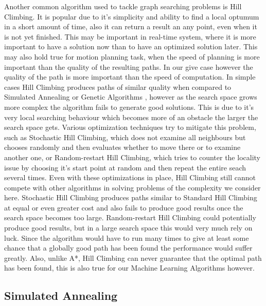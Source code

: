 Another common algorithm used to tackle graph searching problems is Hill Climbing. It is popular due to it's simplicity and ability to find a local optumum in a short amount of time, also it can return a result an any point, even when it is not yet finished. This may be important in real-time system, where it is more important to have a solution now than to have an optimized solution later. This may also hold true for motion planning task, when the speed of planning is more important than the quality of the resulting paths. In our give case however the quality of the path is more important than the speed of computation. In simple cases Hill Climbing produces paths of similar quality when compared to Simulated Annealing or Genetic Algorithms \cite{8}, however as the search space grows more complex the algorithm fails to generate good solutions. This is due to it's very local searching behaviour which becomes more of an obstacle the larger the search space gets. Various optimization techniques try to mitigate this problem, such as Stochastic Hill Climbing, \label{sec:stochastic_hill_climbing} which does not examine all neighbours but chooses randomly and then evaluates whether to move there or to examine another one, or Random-restart Hill Climbing, which tries to counter the locality issue by choosing it's start point at random and then repeat the entire seach several times. Even with these optimizations in place, Hill Climbing still cannot compete with other algorithms in solving problems of the complexity we consider here. Stochastic Hill Climbing produces paths similar to Standard Hill Climbing at equal or even greater cost \cite{8} and also fails to produce good results once the search space becomes too large. Random-restart Hill Climbing could potentially produce good results, but in a large search space this would very much rely on luck. Since the algorithm would have to run many times to give at least some chance that a globally good path has been found the performance would suffer greatly. Also, unlike A*, Hill Climbing can never guarantee that the optimal path has been found, this is also true for our Machine Learning Algorithms however.

\subsection{Simulated Annealing}
\label{sec:simulated_annealing}

